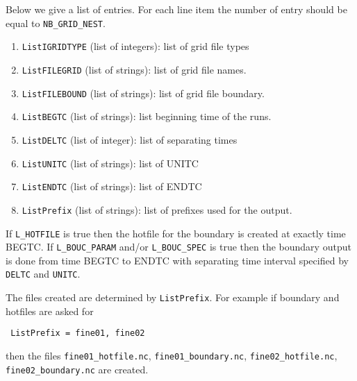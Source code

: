 \documentclass[12pt]{amsart}
\begin{document}
Below we give a list of entries. For each line item the number of entry should be equal to {\tt NB\_GRID\_NEST}.
\begin{enumerate}
\item {\tt ListIGRIDTYPE} (list of integers): list of grid file types
\item {\tt ListFILEGRID} (list of strings): list of grid file names.
\item {\tt ListFILEBOUND} (list of strings): list of grid file boundary.
\item {\tt ListBEGTC} (list of strings): list beginning time of the runs.
\item {\tt ListDELTC} (list of integer): list of separating times
\item {\tt ListUNITC} (list of strings): list of UNITC
\item {\tt ListENDTC} (list of strings): list of ENDTC
\item {\tt ListPrefix} (list of strings): list of prefixes used for the output.
\end{enumerate}
If {\tt L\_HOTFILE} is true then the hotfile for the boundary is created at exactly time BEGTC.
If {\tt L\_BOUC\_PARAM} and/or {\tt L\_BOUC\_SPEC} is true then the boundary output is done from time BEGTC to ENDTC with separating time interval specified by {\tt DELTC} and {\tt UNITC}.

The files created are determined by {\tt ListPrefix}. For example if boundary and hotfiles are asked for
\begin{verbatim}
 ListPrefix = fine01, fine02
\end{verbatim}
then the files {\tt fine01\_hotfile.nc}, {\tt fine01\_boundary.nc}, {\tt fine02\_hotfile.nc}, {\tt fine02\_boundary.nc} are created.



\newpage
\end{document}
